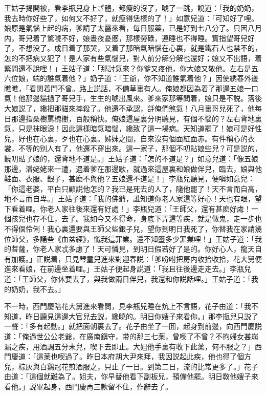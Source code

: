 王姑子揭開被，看李瓶兒身上ざ體，都瘦的沒了，唬了一跳，說道：「我的奶奶，我去時你好些了，如何又不好了，就瘦得恁樣的了！」如意兒道：「可知好了哩。娘原是氣惱上起的病，爹請了太醫來看，每日服薬，已是好到七八分了。只因八月内，哥兒着了驚唬不好，娘晝夜憂慼，那樣勞碌，連睡也不得睡。實指望哥兒好了，不想没了。成日着了那哭，又着了那暗氣暗惱在心裏，就是鐵石人也禁不的，怎的不把病又犯了！是人家有些氣惱兒，對人前分解分解也還好；娘又不出語，着緊問還不說哩！」王姑子道：「那討氣來？你爹又疼他，你大娘又敬他。左右是五六位娘，端的誰氣着他？」奶子道：「王爺，你不知道誰氣着他？」因使綉春外邊瞧瞧，「看関着門不曾。路上説話，不備草裏有人。俺娘都因為着了那邊五娘一口氣！他那邊貓撾了哥兒手，生生的唬出風來。爹來家那等問着，娘只是不説。落後大娘説了，纔把那貓來摔殺了。他還不承認，㧱俺們煞氣！八月裏哥兒死了，他每日那邊指桑樹罵槐樹，百般稱快。俺娘這屋裏分明聽見，有個不惱的？左右背地裏氣，只是抹眼淚！因此這樣暗氣暗惱，纔致了這一場病。天知道罷了！娘可是好性兒，好也在心裏，歹也在心裏。姊妹之間，自來沒有個面紅面赤。有件稱心的衣裳，不等的别人有了，他還不穿出來。這一家子，那個不叨貼娘些兒？可是説的，饒叨貼了娘的，還背地不道是。」王姑子道：「怎的不道是？」如意兒道：「像五娘那邊，潘姥姥來一遭，遇着爹在那邊歇，就過來這屋裏和娘做伴兒，臨去，娘與他鞋面、衣服、銀子，甚麽不與他？五娘還不道是！」李瓶兒聽見，便嗔如意兒：「你這老婆，平白只顧説他怎的？我已是死去的人了，隨他罷了！天不言而自高，地不言而自卑。」王姑子道：「我的佛爺，誰知道你老人家這等好心！天也有眼，望下看着哩。你老人家往後來還有好處！」李瓶兒道：「王師父，還有甚麽好䖏！一個孩兒也存不住，去了。我如今又不得命，身底下弄這等疾，就是做鬼，走一步也不得個伶俐！我心裏還要與王師父些銀子兒，望你到明日我死了，你替我在家請幾位師父，多誦些《血盆經》，懺我這罪業。還不知墮多少罪業哩！」王姑子道：「我的菩薩，你老人家忒多慮了！天可憐見，到明日假若好了是的。你好心人，龍天自有加護。」正説着，只見琴童兒進來對迎春説：「爹吩咐把房内收拾收拾，花大舅便進來看娘，在前邊坐着哩。」王姑子便起身説道：「我且往後邊走走去。」李瓶兒道：「王師父，你休要去了，與我做兩日伴兒，我還和你説話哩。」王姑子道：「我的奶奶，我不去。」

不一時，西門慶陪花大舅進來看問，見李瓶兒睡在炕上不言語，花子由道：「我不知道，昨日聽見這邊大官兒去説，纔曉的。明日你嫂子來看你。」那李瓶兒只説了一聲：「多有起動。」就把面朝裏去了。花子由坐了一囬，起身到前邊，向西門慶説道：「俺過世公公老爺，在廣南鎭守，带的那三七薬，曾喫了不曾？不拘婦女甚崩漏之疾，用酒調五分末兒，喫下去即止。大姐他手裏有收下此薬，何不服之？」西門慶道：「這薬也喫過了。昨日本府胡大尹來拜，我因説起此疾，他也得了個方兒，棕灰與白鷄冠花煎酒服之，只止了一日。到第二日，流的比常更多了。」花子由道：「這個就難為了。姐夫，你早替他看下副板兒，預備他罷。明日敎他嫂子來看他。」説畢起身，西門慶再三款留不住，作辭去了。

